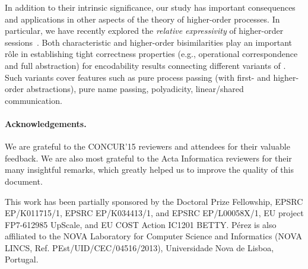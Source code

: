 In addition to their intrinsic significance, our study 
has important consequences and applications in other aspects of the theory of higher-order   processes. 
In particular,  we have recently explored the \emph{relative expressivity}
of higher-order sessions~\cite{DBLP:conf/esop/KouzapasPY16}.  
 Both characteristic and higher-order bisimilarities play an important r\^{o}le in establishing 
 tight correctness properties (e.g., operational correspondence and full abstraction) for encodability results connecting different variants of \HOp.
 Such variants cover
 features such as 
 pure process passing (with first- and higher-order abstractions), pure name passing, polyadicity, linear/shared communication. 

\paragraph{Acknowledgements.} 
We are grateful to the CONCUR'15 reviewers and attendees 
for their valuable feedback.
We are also most grateful to the Acta Informatica reviewers for their many insightful remarks, which greatly helped us to improve the quality of this document.

This work has been partially sponsored by the Doctoral Prize Fellowship, EPSRC EP/K011715/1, EPSRC EP/K034413/1, and EPSRC EP/L00058X/1, EU project FP7-612985 UpScale, and EU COST Action IC1201 BETTY. P\'{e}rez is also affiliated to the NOVA Laboratory for Computer Science and Informatics (NOVA LINCS, Ref. PEst/UID/CEC/04516/2013), Universidade Nova de Lisboa, Portugal.
